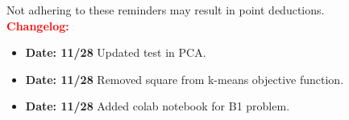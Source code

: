 \documentclass{article}
\begin{document}
Not adhering to these reminders may result in point deductions. \\

\textcolor{red}{\textbf{Changelog:}}

\begin{itemize}
    \item \textbf{Date: 11/28} Updated  test in PCA.
    \item \textbf{Date: 11/28} Removed square from k-means objective function.
    \item \textbf{Date: 11/28} Added colab notebook for B1 problem.
\end{itemize}

\clearpage{}



\setcounter{aprob}{0}
 
\end{document}
